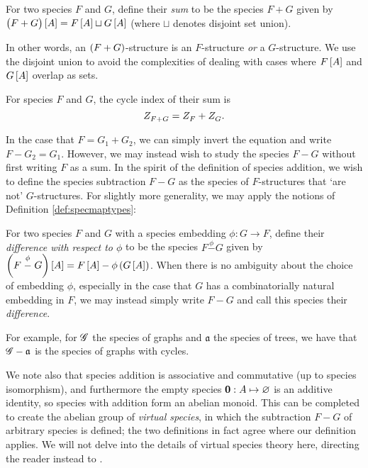 \documentclass[distribution,draft]{brandiss} %
\numberwithin{section}{chapter}
\numberwithin{figure}{chapter}
\begin{document}
\begin{definition}\label{def:specsum}
  For two species $F$ and $G$, define their \emph{sum} to be the species $F + G$ given by $\pbracs[big]{F + G} \sbrac{A} = F \sbrac{A} \sqcup G \sbrac{A}$ (where $\sqcup$ denotes disjoint set union).
\end{definition}
In other words, an $\left( {F + G} \right)$-structure is an $F$-structure \emph{or} a $G$-structure.
We use the disjoint union to avoid the complexities of dealing with cases where $F \left[ {A} \right]$ and $G \left[ {A} \right]$ overlap as sets.

\begin{theorem}\label{thm:specsumci}
  For species $F$ and $G$, the cycle index of their sum is
  \begin{equation}
    \label{eq:specsumci}
     Z_{F + G}^{}  =  Z_{F}^{}  +  Z_{G}^{} .
  \end{equation}
\end{theorem}

In the case that $F = G_{1} + G_{2}$, we can simply invert the equation and write $F - G_{2} = G_{1}$.
However, we may instead wish to study the species $F - G$ without first writing $F$ as a sum.
In the spirit of the definition of species addition, we wish to define the species subtraction $F - G$ as the species of $F$-structures that `are not' $G$-structures.
For slightly more generality, we may apply the notions of Definition \ref{def:specmaptypes}:
\begin{definition}
  \label{def:specdif}
  For two species $F$ and $G$ with a species embedding $\phi: G \to F$, define their \emph{difference with respect to $\phi$} to be the species $F \stackrel{\phi}{-} G$ given by $\left( {F \stackrel{\phi}{-} G} \right) \left[ {A} \right] = F \left[ {A} \right] - \phi \left( {G \left[ {A} \right]} \right)$.
  When there is no ambiguity about the choice of embedding $\phi$, especially in the case that $G$ has a combinatorially natural embedding in $F$, we may instead simply write $F - G$ and call this species their \emph{difference}.
\end{definition}

For example, for $\mathscr{G}$ the species of graphs and $\mathfrak{a}$ the species of trees, we have that $\mathscr{G} - \mathfrak{a}$ is the species of graphs with cycles.

We note also that species addition is associative and commutative (up to species isomorphism), and furthermore the empty species $\mathbf{0}: A \mapsto \varnothing$ is an additive identity, so species with addition form an abelian monoid.
This can be completed to create the abelian group of \emph{virtual species}, in which the subtraction $F - G$ of arbitrary species is defined; the two definitions in fact agree where our definition applies.
We will not delve into the details of virtual species theory here, directing the reader instead to \cite[\S 2.5]{bll:species}.
\end{document}
